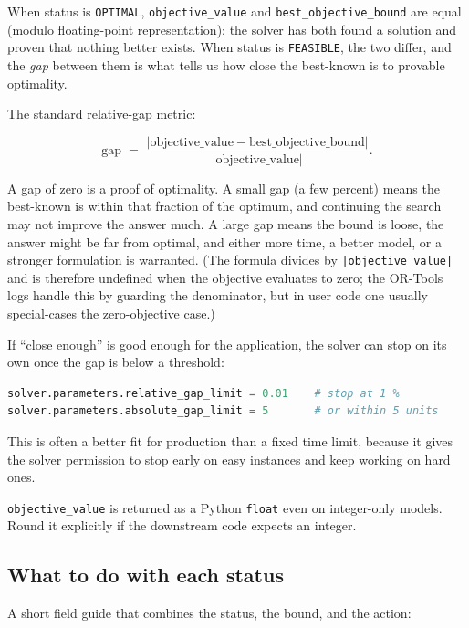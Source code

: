 When status is \lstinline!OPTIMAL!,
\lstinline!objective_value! and
\lstinline!best_objective_bound! are equal (modulo
floating-point representation): the solver has both found a solution and
proven that nothing better exists. When status is
\lstinline!FEASIBLE!, the two differ, and the \emph{gap}
between them is what tells us how close the best-known is to provable
optimality.

The standard relative-gap metric:

\[
\text{gap} \;=\; \frac{|\text{objective\_value} - \text{best\_objective\_bound}|}{|\text{objective\_value}|}.
\]

A gap of zero is a proof of optimality. A small gap (a few percent)
means the best-known is within that fraction of the optimum, and
continuing the search may not improve the answer much. A large gap means
the bound is loose, the answer might be far from optimal, and either
more time, a better model, or a stronger formulation is warranted. (The
formula divides by \lstinline!|objective_value|! and is
therefore undefined when the objective evaluates to zero; the OR-Tools
logs handle this by guarding the denominator, but in user code one
usually special-cases the zero-objective case.)

If ``close enough'' is good enough for the application, the solver can
stop on its own once the gap is below a threshold:

\begin{lstlisting}[language=Python]
solver.parameters.relative_gap_limit = 0.01    # stop at 1 %
solver.parameters.absolute_gap_limit = 5       # or within 5 units
\end{lstlisting}

This is often a better fit for production than a fixed time limit,
because it gives the solver permission to stop early on easy instances
and keep working on hard ones.

\lstinline!objective_value! is returned as a Python
\lstinline!float! even on integer-only models. Round it
explicitly if the downstream code expects an integer.

\subsection{What to do with each status}\label{sec:8.4.4}

A short field guide that combines the status, the bound, and the action:

